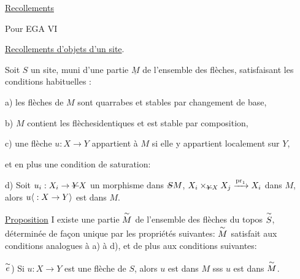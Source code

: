 \hfill\uline{Recollements}


Pour EGA VI

\uline{Recollements d'objets d'un site}.

Soit $S$ un site, muni d'une partie $\underline{M}$ de l'ensemble des flèches, satisfaisant les conditions habituelles :

a) les flèches de $M$ sont quarrabes et stables par changement de base,

b) $M$ contient les flèches\handwritten{\ensuremath{\vert}}identiques et est stable par composition,

c) une flèche $u:X\to Y$ appartient à $M$ si elle y appartient localement sur $Y$,

et en plus une condition de saturation:

d) Soit $u_{\handwritten{i}}:X_{\handwritten{i}}\to\deleted{Y}\handwritten{X}$ un morphisme dans $\deleted{S}\handwritten{M}$,  $X_{\handwritten{i}}\times_{\deleted{Y}\handwritten{X}}X_{\handwritten{j}}\xrightarrow{\mathrm{pr}_{1}}X_{\handwritten{i}}$ dans $M$\handwritten{)},  alors $u\inserted{\handwritten{{}:X\to Y}}$ est dans $M$.


\uline{Proposition} I existe une partie $\overset{\sim}{M}$ de l'ensemble des flèches du topos $\overset{\sim}{S}$, déterminée de façon unique par les propriétés suivantes: $\overset{\sim}{M}$ satisfait aux conditions  analogues à a) à d), et de plus aux conditions suivantes:

$\overset{\sim}{e}$) Si $u:X\to Y$ est une flèche de $S$, alors $u$ est dans $M$ sss $u$ est dans $\overset{\sim}{M}$.

